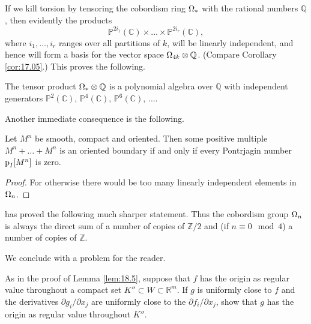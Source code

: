 \documentclass[../main]{subfiles}
\begin{document}
If we kill torsion by tensoring the cobordism ring $\Omega_\ast$ with the rational numbers $\mathbb Q$, then evidently the products \[{\mathbb P}^{2 i_1}(\mathbb C) \times \ldots \times {\mathbb P}^{2 i_r}(\mathbb C),\] where $i_1, \ldots, i_r$ ranges over all partitions of $k$, will be linearly independent, and hence will form a basis for the vector space $\Omega_{4k} \otimes \mathbb Q$. (Compare Corollary \ref{cor:17.05}.) This proves the following. 

\begin{corollary}\label{cor:18.9}
The tensor product $\Omega_\ast \otimes \mathbb Q$ is a polynomial algebra over $\mathbb Q$ with independent generators ${\mathbb P}^2(\mathbb C)$, ${\mathbb P}^4(\mathbb C)$, ${\mathbb P}^6(\mathbb C)$, $\ldots$. 
\end{corollary}

Another immediate consequence is the following. 

\begin{corollary}\label{cor:18.10}
Let $M^n$ be smooth, compact and oriented. Then some positive multiple $M^n + \ldots + M^n$ is an oriented boundary if and only if every Pontrjagin number $\operatorname{p}_I[M^n]$ is zero.
\end{corollary}

\begin{proof}
For otherwise there would be too many linearly independent elements in $\Omega_n$. 
\end{proof}

\cite{wall} has proved the following much sharper statement.  Thus the cobordism group $\Omega_n$ is always the direct sum of a number of copies of ${\mathbb Z}/2$ and (if $n \equiv 0 \mod 4$) a number of copies of $\mathbb Z$. 

We conclude with a problem for the reader.

\begin{problem}\label{prob:18.A}
As in the proof of Lemma \ref{lem:18.5}, suppose that $f$ has the origin as regular value throughout a compact set $K'' \subset W \subset {\mathbb R}^m$. If $g$ is uniformly close to $f$ and the derivatives $\partial g_i/\partial x_j$ are uniformly close to the $\partial f_i/\partial x_j$, show that $g$ has the origin as regular value throughout $K''$. 
\end{problem}
\end{document}
